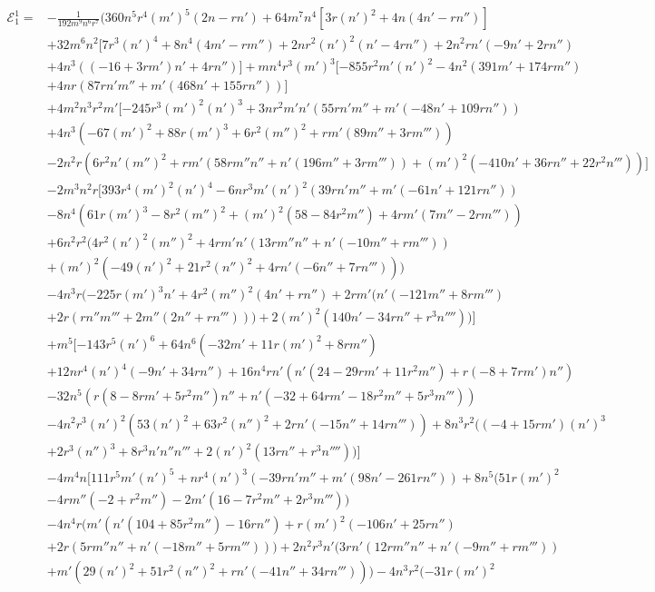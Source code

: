 \documentclass[12pt]{book}
\begin{document}
\begin{equation}
\begin{split}
    \mathcal{E}_1^1=& -\frac{1}{192 m^9 n^6 r^7} \Bigg( 360 n^5 r^4 (m')^5 (2 n - r n') + 64 m^7 n^4  [ 3 r (n')^2 + 4 n (4 n' - r n'')  ]\\ & + 32 m^6 n^2  [ 7 r^3 (n')^4 + 8 n^4 (4 m' - r m'') + 2 n r^2 (n')^2 (n' - 4 r n'') + 2 n^2 r n' (-9 n' + 2 r n'')\\ & + 4 n^3  ( (-16 + 3 r m') n' + 4 r n''  )  ] + m n^4 r^3 (m')^3  [ -855 r^2 m' (n')^2 - 4 n^2 (391 m' + 174 r m'')\\ & + 4 n r  ( 87 r n' m'' + m' (468 n' + 155 r n'')  )  ]\\ & + 4 m^2 n^3 r^2 m'  [ -245 r^3 (m')^2 (n')^3 + 3 n r^2 m' n'  ( 55 r n' m'' + m' (-48 n' + 109 r n'')  )\\ & + 4 n^3  ( -67 (m')^2 + 88 r (m')^3 + 6 r^2 (m'')^2 + r m' (89 m'' + 3 r m''')  )\\ & - 2 n^2 r  ( 6 r^2 n' (m'')^2 + r m'  ( 58 r m'' n'' + n' (196 m'' + 3 r m''')  ) + (m')^2 (-410 n' + 36 r n'' + 22 r^2 n''')  )  ]\\ & - 2 m^3 n^2 r  [ 393 r^4 (m')^2 (n')^4 - 6 n r^3 m' (n')^2  ( 39 r n' m'' + m' (-61 n' + 121 r n'')  )\\ & - 8 n^4  ( 61 r (m')^3 - 8 r^2 (m'')^2 + (m')^2 (58 - 84 r^2 m'') + 4 r m' (7 m'' - 2 r m''')  )\\ & + 6 n^2 r^2  ( 4 r^2 (n')^2 (m'')^2 + 4 r m' n'  ( 13 r m'' n'' + n' (-10 m'' + r m''')  ) \\ &+ (m')^2 (-49 (n')^2 + 21 r^2 (n'')^2 + 4 r n' (-6 n'' + 7 r n'''))  )\\ & - 4 n^3 r  ( -225 r (m')^3 n' + 4 r^2 (m'')^2 (4 n' + r n'') + 2 r m'  ( n' (-121 m'' + 8 r m''') \\ &+ 2 r (r n'' m''' + 2 m'' (2 n'' + r n'''))  ) + 2 (m')^2 (140 n' - 34 r n'' + r^3 n'''')  )  ] \\ &+ m^5  [ -143 r^5 (n')^6 + 64 n^6 (-32 m' + 11 r (m')^2 + 8 r m'') \\ &+ 12 n r^4 (n')^4 (-9 n' + 34 r n'') + 16 n^4 r n'  ( n' (24 - 29 r m' + 11 r^2 m'') + r (-8 + 7 r m') n''  )\\ & - 32 n^5  ( r (8 - 8 r m' + 5 r^2 m'') n'' + n' (-32 + 64 r m' - 18 r^2 m'' + 5 r^3 m''')  ) \\ &- 4 n^2 r^3 (n')^2  ( 53 (n')^2 + 63 r^2 (n'')^2 + 2 r n' (-15 n'' + 14 r n''')  ) + 8 n^3 r^2  ( (-4 + 15 r m') (n')^3 \\ &+ 2 r^3 (n'')^3 + 8 r^3 n' n'' n''' + 2 (n')^2 (13 r n'' + r^3 n'''')  )  ]\\ & - 4 m^4 n  [ 111 r^5 m' (n')^5 + n r^4 (n')^3  ( -39 r n' m'' + m' (98 n' - 261 r n'')  ) + 8 n^5  ( 51 r (m')^2\\ & - 4 r m'' (-2 + r^2 m'') - 2 m' (16 - 7 r^2 m'' + 2 r^3 m''')  ) \\ &- 4 n^4 r  ( m'  ( n' (104 + 85 r^2 m'') - 16 r n''  ) + r (m')^2 (-106 n' + 25 r n'')\\ & + 2 r  ( 5 r m'' n'' + n' (-18 m'' + 5 r m''')  )  ) + 2 n^2 r^3 n'  ( 3 r n'  ( 12 r m'' n'' + n' (-9 m'' + r m''')  )\\ & + m'  ( 29 (n')^2 + 51 r^2 (n'')^2 + r n' (-41 n'' + 34 r n''')  )  ) - 4 n^3 r^2  ( -31 r (m')^2 
\end{split}
\end{equation}
\end{document}
